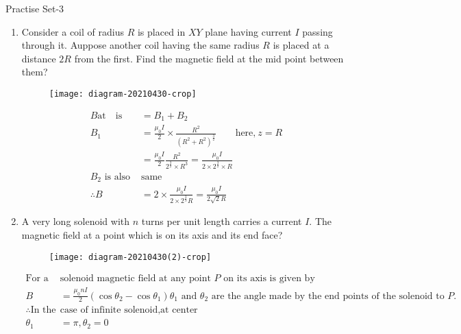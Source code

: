 \newpage
\begin{abox}
	Practise Set-3
\end{abox}
\begin{enumerate}[ label=\color{ocre}\textbf{\arabic*.}]
	\item Consider a coil of radius $R$ is placed in $XY$ plane having current $I$ passing through it. Auppose another coil having the same radius $R$ is placed at a distance $2R$ from the first. Find the magnetic field at the mid point between them?
	\begin{figure}[H]
		\begin{center}
			\texttt{[image: diagram-20210430-crop]}
		\end{center}
	\end{figure}
	\begin{answer}
		\begin{align*}
		B \text{at}\quad\text{is}&=B_1+B_2\\
		B_1&=\frac{\mu_{0} I}{2}\times\frac{R^2}{(R^2+R^2)^\frac{3}{2}}\qquad \text{here,}\ z=R\\
		&=\frac{\mu_0 I}{2}\frac{R^2}{2^\frac{3}{2}\times R^3}=\frac{\mu_0 I}{2\times2^\frac{3}{2}\times R}\\
		B_2 \text{ is also }&\text{same}\\
		\therefore B&=2\times\frac{\mu_0 I}{2\times2^\frac{2}{3}R}=\frac{\mu_0I}{2\sqrt{2}R}
		\end{align*}
	\end{answer}
	\item  A very long solenoid with $n$ turns per unit length carries a current $I$. The magnetic field at a point which is on its axis and its end face?
	\begin{figure}[H]
		\begin{center}
			\texttt{[image: diagram-20210430(2)-crop]}
		\end{center}
	\end{figure}
	\begin{answer}
		\begin{align*}
		\text{For a  }&\text{solenoid magnetic field  at any point $P$ on its axis is given by}\\
		B&=\frac{\mu_0 nI}{2}(\cos\theta_2-\cos\theta_1)
		\text{$\theta_1$ and $\theta_2$ are the angle made by the end points of the solenoid to $P$.}\\
		\therefore\text{In the  }&\text{case of infinite solenoid,at center}\\
		\theta_1&=\pi,\theta_2=0\\

\end{align*}
\end{answer}
\end{enumerate}
